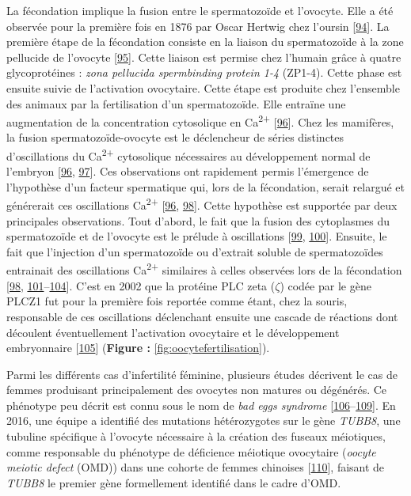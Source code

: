 \documentclass[12pt,a4paper,twoside]{ugathesis}
\theoremstyle{definition}
\theoremstyle{definition}
\theoremstyle{definition}
\theoremstyle{remark}
\begin{document}
La fécondation implique la fusion entre le spermatozoïde et l'ovocyte.
Elle a été observée pour la première fois en 1876 par Oscar Hertwig chez
l'oursin {[}\protect\hyperlink{ref-hertwig1875beitrage}{94}{]}. La
première étape de la fécondation consiste en la liaison du spermatozoïde
à la zone pellucide de l'ovocyte
{[}\protect\hyperlink{ref-Wassarman2008}{95}{]}. Cette liaison est
permise chez l'humain grâce à quatre glycoprotéines : \emph{zona
pellucida spermbinding protein 1-4} (ZP1-4). Cette phase est ensuite
suivie de l'activation ovocytaire. Cette étape est produite chez
l'ensemble des animaux par la fertilisation d'un spermatozoïde. Elle
entraïne une augmentation de la concentration cytosolique en
Ca\textsuperscript{2+} {[}\protect\hyperlink{ref-Stricker}{96}{]}. Chez
les mamifères, la fusion spermatozoïde-ovocyte est le déclencheur de
séries distinctes d'oscillations du Ca\textsuperscript{2+} cytosolique
nécessaires au développement normal de l'embryon
{[}\protect\hyperlink{ref-Stricker}{96},
\protect\hyperlink{ref-Miyazaki1993}{97}{]}. Ces observations ont
rapidement permis l'émergence de l'hypothèse d'un facteur spermatique
qui, lors de la fécondation, serait relargué et générerait ces
oscillations Ca\textsuperscript{2+}
{[}\protect\hyperlink{ref-Stricker}{96},
\protect\hyperlink{ref-Swann1990}{98}{]}. Cette hypothèse est supportée
par deux principales observations. Tout d'abord, le fait que la fusion
des cytoplasmes du spermatozoïde et de l'ovocyte est le prélude à
oscillations {[}\protect\hyperlink{ref-Sun1992}{99},
\protect\hyperlink{ref-Lawrence1997}{100}{]}. Ensuite, le fait que
l'injection d'un spermatozoïde ou d'extrait soluble de spermatozoïdes
entrainait des oscillations Ca\textsuperscript{2+} similaires à celles
observées lors de la fécondation
{[}\protect\hyperlink{ref-Swann1990}{98},
\protect\hyperlink{ref-Wu1997}{101}--\protect\hyperlink{ref-Tang2000}{104}{]}.
C'est en 2002 que la protéine PLC zeta (\(\zeta\)) codée par le gène
PLCZ1 fut pour la première fois reportée comme étant, chez la souris,
responsable de ces oscillations déclenchant ensuite une cascade de
réactions dont découlent éventuellement l'activation ovocytaire et le
développement embryonnaire
{[}\protect\hyperlink{ref-Saunders2002}{105}{]} (\textbf{Figure :}
\ref{fig:oocytefertilisation}).

Parmi les différents cas d'infertilité féminine, plusieurs études
décrivent le cas de femmes produisant principalement des ovocytes non
matures ou dégénérés. Ce phénotype peu décrit est connu sous le nom de
\emph{bad eggs syndrome}
{[}\protect\hyperlink{ref-Hartshorne1999}{106}--\protect\hyperlink{ref-Hourvitz2010}{109}{]}.
En 2016, une équipe a identifié des mutations hétérozygotes sur le gène
\emph{TUBB8}, une tubuline spécifique à l'ovocyte nécessaire à la
création des fuseaux méiotiques, comme responsable du phénotype de
déficience méiotique ovocytaire (\emph{oocyte meiotic defect} (OMD))
dans une cohorte de femmes chinoises
{[}\protect\hyperlink{ref-Feng2016}{110}{]}, faisant de \emph{TUBB8} le
premier gène formellement identifié dans le cadre d'OMD.
\end{document}
